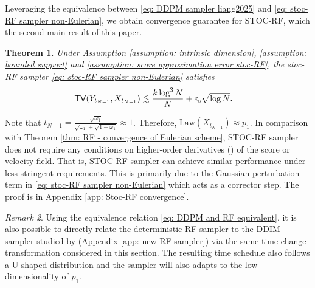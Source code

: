 \documentclass{article}
\theoremstyle{plain}
\newtheorem{theorem}{Theorem}[section]
\theoremstyle{definition}
\theoremstyle{remark}
\newtheorem{remark}[theorem]{Remark}
\def\TV{{\sf TV}}
\def\meanescore{\varepsilon_{\rm s}}
\newcommand{\Law}{\text{Law}}
\begin{document}
 Leveraging the equivalence between \eqref{eq: DDPM sampler liang2025} and \eqref{eq: stoc-RF sampler non-Eulerian}, we obtain convergence guarantee for STOC-RF, which the second main result of this paper.
 \begin{theorem}
     \label{thm: stoc-RF sampler non-Eulerian}
     Under Assumption \ref{assumption: intrinsic dimension}, \ref{assumption: bounded support} and \ref{assumption: score approximation error stoc-RF}, the stoc-RF sampler \eqref{eq: stoc-RF sampler non-Eulerian} satisfies 
     \begin{align*}
     & \TV(Y_{t_{N-1}}, X_{t_{N-1}}) \lesssim \frac{k \log^3 N}{N} +  \meanescore \sqrt{\log N}.
     \end{align*}
 \end{theorem}
 Note that $t_{N-1} = \frac{\sqrt{\omega_1}}{\sqrt{\omega_1} + \sqrt{1 - \omega_1}} \approx 1$. Therefore, $\Law(X_{t_{N-1}}) \approx p_1$. In comparison with Theorem \ref{thm: RF - convergence of Eulerian scheme}, STOC-RF sampler does not require any conditions on higher-order derivatives () of the score or velocity field. That is, STOC-RF sampler can achieve similar performance under less stringent requirements. This is primarily due to the Gaussian perturbation term in \eqref{eq: stoc-RF sampler non-Eulerian} which acts as a corrector step. The proof is in Appendix \ref{app: Stoc-RF convergence}.

\begin{remark}
\label{remark: new RF sampler}
Using the equivalence relation \eqref{eq: DDPM and RF equivalent}, it is also possible to directly relate the deterministic RF sampler to the DDIM sampler studied by \citet[Theorem 1]{liang2025low} (Appendix \ref{app: new RF sampler}) via the same time change transformation considered in this section. The resulting time schedule also follows a U-shaped distribution and the sampler will also adapts to the low-dimensionality of $p_1$.
\end{remark}
\end{document}
